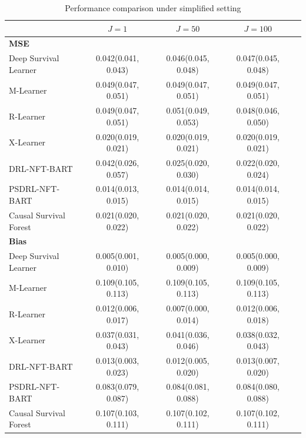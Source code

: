 \documentclass{article}
\begin{document}
\begin{table}[ht]
    \centering
    \caption{Performance comparison under simplified setting}\label{tab_simple_setting}
    \begin{threeparttable}
    \begin{tabular}{lcccc}
         \hline
         & $J=1$ & $J=50$ & $J=100$ \\
         \hline
         \multicolumn{4}{l}{\textbf{MSE}}\\
         \hline
         Deep Survival Learner & 0.042(0.041, 0.043) & 0.046(0.045, 0.048) & 0.047(0.045, 0.048) \\
         M-Learner & 0.049(0.047, 0.051) & 0.049(0.047, 0.051) & 0.049(0.047, 0.051) \\
         R-Learner & 0.049(0.047, 0.051) & 0.051(0.049, 0.053) & 0.048(0.046, 0.050) \\
         X-Learner & 0.020(0.019, 0.021) & 0.020(0.019, 0.021) & 0.020(0.019, 0.021) \\
         DRL-NFT-BART          & 0.042(0.026, 0.057) & 0.025(0.020, 0.030) & 0.022(0.020, 0.024)\\
         PSDRL-NFT-BART        & 0.014(0.013, 0.015) & 0.014(0.014, 0.015) & 0.014(0.014, 0.015)\\
         Causal Survival Forest & 0.021(0.020, 0.022) & 0.021(0.020, 0.022) &  0.021(0.020, 0.022) \\
         \hline
         \multicolumn{4}{l}{\textbf{Bias}} \\
         \hline
         Deep Survival Learner & 0.005(0.001, 0.010) & 0.005(0.000, 0.009) & 0.005(0.000, 0.009) \\
         M-Learner & 0.109(0.105, 0.113) & 0.109(0.105, 0.113) & 0.109(0.105, 0.113) \\
         R-Learner & 0.012(0.006, 0.017) & 0.007(0.000, 0.014) & 0.012(0.006, 0.018) \\
         X-Learner & 0.037(0.031, 0.043) & 0.041(0.036, 0.046) & 0.038(0.032, 0.043) \\
         DRL-NFT-BART          & 0.013(0.003, 0.023) & 0.012(0.005, 0.020) & 0.013(0.007, 0.020)\\
         PSDRL-NFT-BART        & 0.083(0.079, 0.087) & 0.084(0.081, 0.088) & 0.084(0.080, 0.088)\\
         Causal Survival Forest & 0.107(0.103, 0.111) & 0.107(0.102, 0.111) & 0.107(0.102, 0.111) \\
         \hline
    \end{tabular}
    \begin{tablenotes}\footnotesize

\end{tablenotes}
\end{threeparttable}
\end{table}
\end{document}
